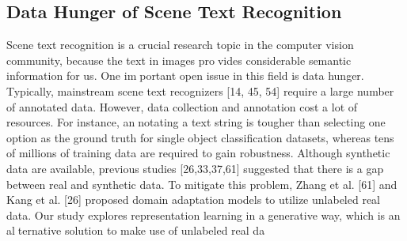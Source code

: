 \documentclass{article}
\begin{document}
\begin{multicols}{2}
\subsection{ Data Hunger of Scene Text Recognition}
Scene text recognition is a crucial research topic in the
computer vision community, because the text in images provides considerable semantic information for us. One important open issue in this field is data hunger. Typically,
mainstream scene text recognizers [14, 45, 54] require a
large number of annotated data. However, data collection
and annotation cost a lot of resources. For instance, annotating a text string is tougher than selecting one option
as the ground truth for single object classification datasets,
whereas tens of millions of training data are required to gain
robustness. Although synthetic data are available, previous
studies [26,33,37,61] suggested that there is a gap between
real and synthetic data. To mitigate this problem, Zhang et
al. [61] and Kang et al. [26] proposed domain adaptation
models to utilize unlabeled real data. Our study explores
representation learning in a generative way, which is an alternative solution to make use of unlabeled real da

\end{multicols}
\end{document}
